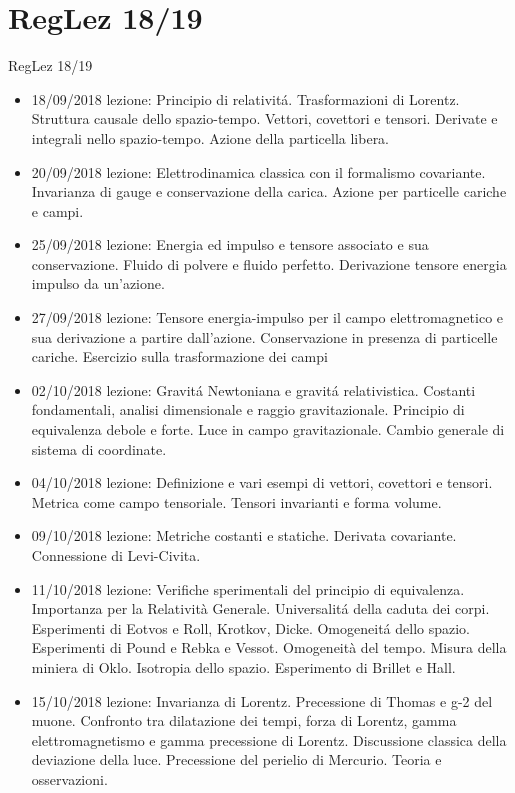 \section{RegLez 18/19}
\begin{frame}[allowframebreaks]{RegLez 18/19}
\begin{itemize}
    \item 18/09/2018 lezione: Principio di relativit\'a. Trasformazioni di Lorentz. Struttura causale dello spazio-tempo. Vettori, covettori e tensori. Derivate e integrali nello spazio-tempo. Azione della particella libera.
\item 20/09/2018 lezione: Elettrodinamica classica con il formalismo covariante. Invarianza di gauge e conservazione della carica. Azione per particelle cariche e campi.
\item 25/09/2018 lezione: Energia ed impulso e tensore associato e sua conservazione. Fluido di polvere e fluido perfetto. Derivazione tensore energia impulso da un'azione.
\item 27/09/2018 lezione: Tensore energia-impulso per il campo elettromagnetico e sua derivazione a partire dall'azione. Conservazione in presenza di particelle cariche. Esercizio sulla trasformazione dei campi
\item 02/10/2018 lezione: Gravit\'a Newtoniana e gravit\'a relativistica. Costanti fondamentali, analisi dimensionale e raggio gravitazionale. Principio di equivalenza debole e forte. Luce in campo gravitazionale. Cambio generale di sistema di coordinate.
\item 04/10/2018 lezione: Definizione e vari esempi di vettori, covettori e tensori. Metrica come campo tensoriale. Tensori invarianti e forma volume.
\item 09/10/2018 lezione: Metriche costanti e statiche. Derivata covariante. Connessione di Levi-Civita.
\item 11/10/2018 lezione: Verifiche sperimentali del principio di equivalenza. Importanza per la Relatività Generale. Universalit\'a della caduta dei corpi. Esperimenti di Eotvos e Roll, Krotkov, Dicke. Omogeneit\'a dello spazio. Esperimenti di Pound e Rebka e Vessot. Omogeneità del tempo. Misura della miniera di Oklo. Isotropia dello spazio. Esperimento di Brillet e Hall.
\item 15/10/2018 lezione: Invarianza di Lorentz. Precessione di Thomas e g-2 del muone. Confronto tra dilatazione dei tempi, forza di Lorentz, gamma elettromagnetismo e gamma precessione di Lorentz. Discussione classica della deviazione della luce. Precessione del perielio di Mercurio. Teoria e osservazioni.

\end{itemize}
\end{frame}
